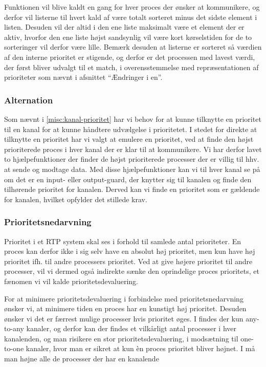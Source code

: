 Funktionen  vil blive kaldt en gang for hver proces der ønsker at kommunikere, og derfor vil listerne til hvert kald af  være totalt sorteret minus det sidste element i listen. Desuden vil der altid i den ene liste maksimalt være et element der er aktiv, hvorfor den ene liste højst sandsynlig vil være kort kørselstiden for de to sorteringer vil derfor være lille. Bemærk desuden at listerne er sorteret så værdien af den interne prioritet er stigende, og derfor er det processen med lavest værdi, der først bliver udvalgt til et match, i overensstemmelse med repræsentationen af prioriteter som nævnt i afsnittet ``Ændringer i \sched en''.

\subsubsection*{Alternation}
Som nævnt i \cref{misc:kanal-prioritet} har vi behov for at kunne tilknytte en prioritet til en kanal for at kunne håndtere udvælgelse i  prioritetet. I stedet for direkte at tilknytte en prioritet har vi valgt at emulere en prioritet, ved at finde den højst prioriterede proces i hver kanal der er klar til at kommunikere.  Vi har derfor lavet to hjælpefunktioner der finder de højst prioriterede processer der er villig til hhv. at sende og modtage data. Med disse hjælpefunktioner kan vi til hver kanal se på om det er en input- eller output-guard, der knytter sig til kanalen og finde den tilhørende prioritet for kanalen. Derved kan vi finde en prioritet som er gældende for kanalen, hvilket opfylder det stillede krav. 



\subsubsection*{Prioritetsnedarvning}
Prioritet i et RTP system skal ses i forhold til samlede antal prioriteter. En proces kan derfor ikke i sig selv have en absolut høj prioritet, men kun have høj prioritet ifh. til andre processers prioritet. Ved at give højere prioritet til andre processer, vil vi dermed også indirekte sænke den oprindelige proces prioritets, et fænomen vi vil kalde prioritetsdevaluering.

For at minimere prioritetsdevaluering i forbindelse med prioritetsnedarvning  ønsker vi, at minimere tiden en proces har en kunstigt høj prioritet. Desuden ønsker vi det er færrest mulige processer hvis prioritet øges. I \pycsp findes der kun any-to-any kanaler, og derfor kan der findes et vilkårligt antal processer i hver kanalenden, og man risikere en stor prioritetsdevaluering, i modsætning til  one-to-one kanaler, hvor man er sikret at kun èn proces prioritet bliver højnet. I \pycsp må man højne alle de processer der har en kanalende 


